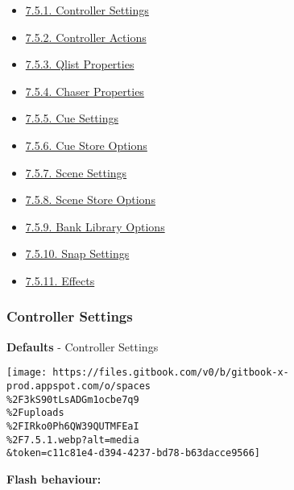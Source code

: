 \documentclass[
]{article}
\providecommand{\tightlist}{%
  \setlength{\itemsep}{0pt}\setlength{\parskip}{0pt}}
\begin{document}
\begin{itemize}
\tightlist
\item
  \href{https://vibemanual.compulite.com/system-default-settings.html\#controller-settings}{7.5.1. Controller Settings}
\item
  \href{https://vibemanual.compulite.com/system-default-settings.html\#controller-actions}{7.5.2. Controller Actions}
\item
  \href{https://vibemanual.compulite.com/system-default-settings.html\#qlist-properties}{7.5.3. Qlist Properties}
\item
  \href{https://vibemanual.compulite.com/system-default-settings.html\#chaser-properties}{7.5.4. Chaser Properties}
\item
  \href{https://vibemanual.compulite.com/system-default-settings.html\#cue-settings}{7.5.5. Cue Settings}
\item
  \href{https://vibemanual.compulite.com/system-default-settings.html\#cue-store-options}{7.5.6. Cue Store Options}
\item
  \href{https://vibemanual.compulite.com/system-default-settings.html\#scene-settings}{7.5.7. Scene Settings}
\item
  \href{https://vibemanual.compulite.com/system-default-settings.html\#scene-store-options}{7.5.8. Scene Store Options}
\item
  \href{https://vibemanual.compulite.com/system-default-settings.html\#bank-library-options}{7.5.9. Bank Library Options}
\item
  \href{https://vibemanual.compulite.com/system-default-settings.html\#snap-settings}{7.5.10. Snap Settings}
\item
  \href{https://vibemanual.compulite.com/system-default-settings.html\#effects}{7.5.11. Effects}
\end{itemize}

\hypertarget{controller-settings}{%
\subsubsection{Controller Settings}\label{controller-settings}}

\textbf{Defaults} - Controller Settings

\texttt{[image: https://files.gitbook.com/v0/b/gitbook-x-prod.appspot.com/o/spaces\\\%2F3kS90tLsADGm1ocbe7q9\\\%2Fuploads\\\%2FIRko0Ph6QW39QUTMFEaI\\\%2F7.5.1.webp?alt=media\\\&token=c11c81e4-d394-4237-bd78-b63dacce9566]}

\textbf{Flash behaviour:}
\end{document}

